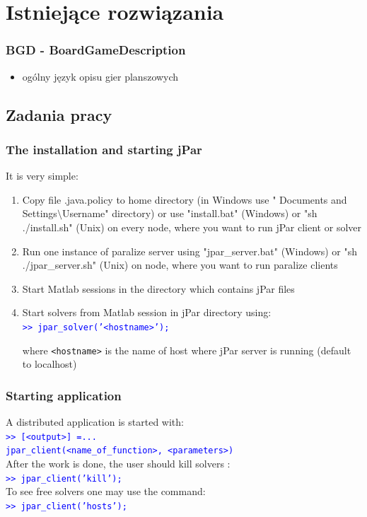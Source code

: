 \documentclass{beamer}
\begin{document}
\section{Istniejące rozwiązania}

\begin{frame}
   \frametitle{BGD - BoardGameDescription}

   \begin{itemize}
      \item ogólny język opisu gier planszowych
   \end{itemize}

\end{frame}

\begin{frame}[fragile]
   \section{Zadania pracy}
   \frametitle{The installation and starting jPar}
   It is very simple:
   \begin{enumerate}
      \item Copy file .java.policy to home directory (in Windows use
            " Documents and Settings$\setminus$Username" directory) or use "install.bat" (Windows)
            or "sh ./install.sh" (Unix) on every node, where you want to run
            jPar client or solver
      \item Run one instance of paralize server using "jpar\_server.bat" (Windows)
            or "sh ./jpar\_server.sh" (Unix) on node, where you want to run paralize
            clients
      \item Start Matlab sessions in the directory which contains
            jPar files
      \item Start solvers from Matlab session in jPar directory
            using:\\

            \textcolor{blue}{\tt >> jpar\_solver('<hostname>');}

            where {\tt <hostname>} is the name of host where jPar server is running
            (default to localhost)\\
   \end{enumerate}
\end{frame}
\begin{frame}
   \frametitle{Starting application}
   A distributed application is started with:\\
   \vskip 0.2cm
   \textcolor{blue}{\tt >> [<output>] =...}\\
   \hspace{0.5cm} \textcolor{blue}{\tt jpar\_client(<name\_of\_function>, <parameters>)}  \\
   \vskip 0.2cm
   After the work is done, the user should kill solvers :\\
   \vskip 0.2cm
   \textcolor{blue}   {\tt >> jpar\_client('kill');}\\
   \vskip 0.2cm
   To see free solvers one may use the command:\\
   \vskip 0.2cm
   \textcolor{blue}   {\tt >> jpar\_client('hosts');}

\end{frame}
\end{document}
